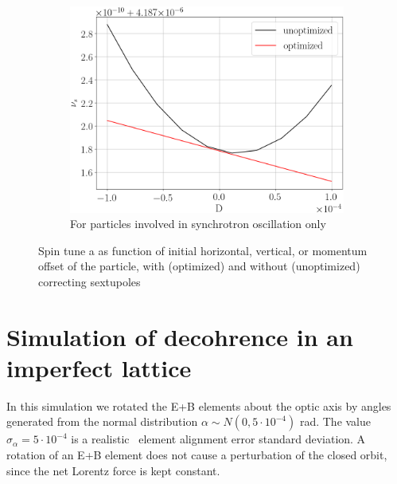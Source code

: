 \documentclass[a4paper]{jacow}
\newcommand{\subwidth}{.9\linewidth}
\begin{document}
\begin{figure}[ht]
\begin{subfigure}{\subwidth}
    \centering
    \includegraphics[width=\linewidth]{../img/IPAC19/spin_tune_decoh_d_offset}
    \caption{For particles involved in synchrotron oscillation only\label{fig:st_decoh_synchrotron}}
  \end{subfigure}
  \caption{Spin tune a as function of initial horizontal, vertical, or momentum offset of the particle,
    with (optimized) and without (unoptimized) correcting sextupoles\label{fig:decoherence_suppression_sim}}
\end{figure}

\section{Simulation of decohrence in an imperfect lattice}
In this simulation we rotated the E+B elements about the optic axis by angles generated from the
normal distribution $\alpha \sim N(0, 5\cdot 10^{-4})$ rad. The value $\sigma_\alpha = 5\cdot 10^{-4}$ is
a realistic~\cite{Senichev:FDM} element alignment error standard deviation. A rotation of an E+B element
does not cause a perturbation of the closed orbit, since the net Lorentz force is kept constant.
\end{document}
